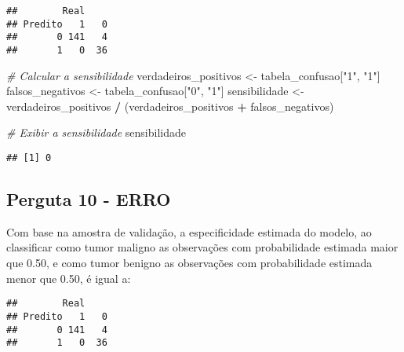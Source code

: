 \documentclass[
]{article}
\newenvironment{Shaded}{\begin{snugshade}}{\end{snugshade}}
\newcommand{\AttributeTok}[1]{\textcolor[rgb]{0.13,0.29,0.53}{#1}}
\newcommand{\CommentTok}[1]{\textcolor[rgb]{0.56,0.35,0.01}{\textit{#1}}}
\newcommand{\FunctionTok}[1]{\textcolor[rgb]{0.13,0.29,0.53}{\textbf{#1}}}
\newcommand{\NormalTok}[1]{#1}
\newcommand{\OtherTok}[1]{\textcolor[rgb]{0.56,0.35,0.01}{#1}}
\newcommand{\SpecialCharTok}[1]{\textcolor[rgb]{0.81,0.36,0.00}{\textbf{#1}}}
\newcommand{\StringTok}[1]{\textcolor[rgb]{0.31,0.60,0.02}{#1}}
\begin{document}
\begin{verbatim}
##        Real
## Predito   1   0
##       0 141   4
##       1   0  36
\end{verbatim}

\begin{Shaded}
\begin{Highlighting}[]
\CommentTok{\# Calcular a sensibilidade}
\NormalTok{verdadeiros\_positivos }\OtherTok{\textless{}{-}}\NormalTok{ tabela\_confusao[}\StringTok{"1"}\NormalTok{, }\StringTok{"1"}\NormalTok{]}
\NormalTok{falsos\_negativos }\OtherTok{\textless{}{-}}\NormalTok{ tabela\_confusao[}\StringTok{"0"}\NormalTok{, }\StringTok{"1"}\NormalTok{]}
\NormalTok{sensibilidade }\OtherTok{\textless{}{-}}\NormalTok{ verdadeiros\_positivos }\SpecialCharTok{/}\NormalTok{ (verdadeiros\_positivos }\SpecialCharTok{+}\NormalTok{ falsos\_negativos)}

\CommentTok{\# Exibir a sensibilidade}
\NormalTok{sensibilidade}
\end{Highlighting}
\end{Shaded}

\begin{verbatim}
## [1] 0
\end{verbatim}

\subsection{Perguta 10 - ERRO}\label{perguta-10---erro}

Com base na amostra de validação, a especificidade estimada do modelo,
ao classificar como tumor maligno as observações com probabilidade
estimada maior que 0.50, e como tumor benigno as observações com
probabilidade estimada menor que 0.50, é igual a:

\begin{Shaded}
\end{Shaded}

\begin{verbatim}
##        Real
## Predito   1   0
##       0 141   4
##       1   0  36
\end{verbatim}
\end{document}
